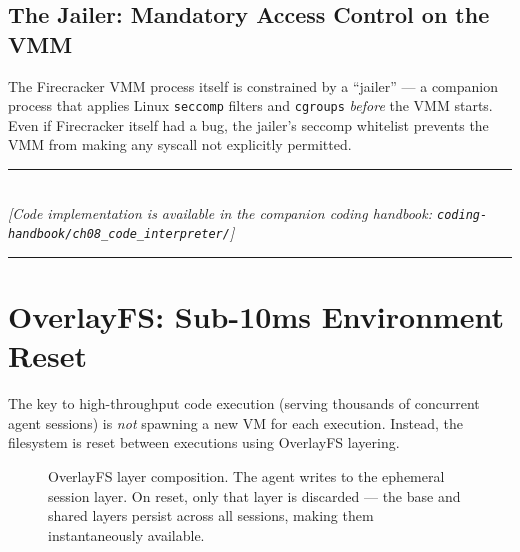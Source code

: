 \subsection{The Jailer: Mandatory Access Control on the VMM}
The Firecracker VMM process itself is constrained by a ``jailer'' — a companion process that applies Linux \texttt{seccomp} filters and \texttt{cgroups} \textit{before} the VMM starts. Even if Firecracker itself had a bug, the jailer's seccomp whitelist prevents the VMM from making any syscall not explicitly permitted.


\begin{center}
\noindent\rule{0.6\textwidth}{0.4pt} \\
\vspace{0.3em}
\textit{[Code implementation is available in the companion coding handbook: \texttt{coding-handbook/ch08\_code\_interpreter/}]} \\
\noindent\rule{0.6\textwidth}{0.4pt}
\end{center}


\section{OverlayFS: Sub-10ms Environment Reset}

The key to high-throughput code execution (serving thousands of concurrent agent sessions) is \textit{not} spawning a new VM for each execution. Instead, the filesystem is reset between executions using OverlayFS layering.

\begin{figure}[ht]
\centering
{}
\caption{OverlayFS layer composition. The agent writes to the ephemeral session layer. On reset, only that layer is discarded — the base and shared layers persist across all sessions, making them instantaneously available.}
\end{figure}


